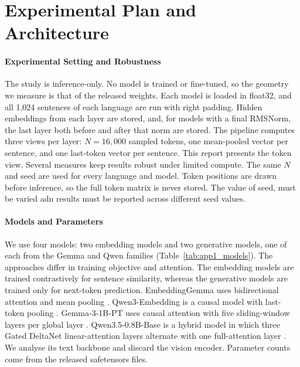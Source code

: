 \section{Experimental Plan and Architecture}
\label{sec:app1_experimental_plan}

\paragraph{Experimental Setting and Robustness}
The study is inference-only. No model is trained or fine-tuned, so the geometry we measure is that of the released weights. Each model is loaded in float32, and all 1{,}024 sentences of each language are run with right padding. Hidden embeddings from each layer are stored, and, for models with a final RMSNorm, the last layer both before and after that norm are stored. The pipeline computes three views per layer: $N = 16{,}000$ sampled tokens, one mean-pooled vector per sentence, and one last-token vector per sentence. This report presents the token view. 
Several measures keep results robust under limited compute. The same $N$ and seed are used for every language and model. Token positions are drawn before inference, so the full token matrix is never stored. The value of seed, must be varied adn results must be reported across different seed values.

\paragraph{Models and Parameters}
We use four models: two embedding models and two generative models, one of each from the Gemma and Qwen families (Table~\ref{tab:app1_models}). The approaches differ in training objective and attention. The embedding models are trained contrastively for sentence similarity, whereas the generative models are trained only for next-token prediction. EmbeddingGemma uses bidirectional attention and mean pooling \citep{vera-etal-2025-embeddinggemma}. Qwen3-Embedding is a causal model with last-token pooling \citep{zhang-etal-2025-qwen3embedding}. Gemma-3-1B-PT uses causal attention with five sliding-window layers per global layer \citep{gemmateam-2025-gemma3}. Qwen3.5-0.8B-Base is a hybrid model in which three Gated DeltaNet linear-attention layers alternate with one full-attention layer \citep{qwenteam-2026-qwen35}. We analyse its text backbone and discard the vision encoder. Parameter counts come from the released safetensors files.

